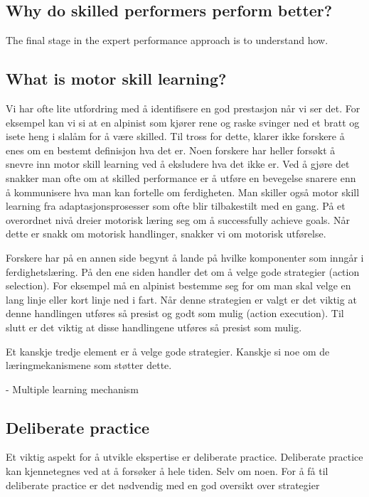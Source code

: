 \documentclass[letterpaper,10pt]{article}
\begin{document}
\subsection{Why do skilled performers perform better?}
The final stage in the expert performance approach is to understand how.

\subsection{What is motor skill learning?}
Vi har ofte lite utfordring med å identifisere en god prestasjon når vi ser det. For eksempel kan vi si at en alpinist som kjører rene og raske svinger ned et bratt og isete heng i slalåm for å være skilled. Til tross for dette, klarer ikke forskere å enes om en bestemt definisjon hva det er. Noen forskere har heller forsøkt å snevre inn motor skill learning ved å eksludere hva det ikke er. Ved å gjøre det snakker man ofte om at skilled performance er å utføre en bevegelse snarere enn å kommunisere hva man kan fortelle om ferdigheten. Man skiller også motor skill learning fra adaptasjonsprosesser som ofte blir tilbakestilt med en gang. På et overordnet nivå dreier motorisk læring seg om å successfully achieve goals. Når dette er snakk om motorisk handlinger, snakker vi om motorisk utførelse.

Forskere har på en annen side begynt å lande på hvilke komponenter som inngår i ferdighetslæring. På den ene siden handler det om å velge gode strategier (action selection). For eksempel må en alpinist bestemme seg for om man skal velge en lang linje eller kort linje ned i fart. Når denne strategien er valgt er det viktig at denne handlingen utføres så presist og godt som mulig (action execution). Til slutt er det viktig at disse handlingene utføres så presist som mulig. 

Et kanskje tredje element er å velge gode strategier. Kanskje si noe om de læringmekanismene som støtter dette. 


- Multiple learning mechanism

\subsection{Deliberate practice}
Et viktig aspekt for å utvikle ekspertise er deliberate practice. Deliberate practice kan kjennetegnes ved at å forsøker å hele tiden. Selv om noen. For å få til deliberate practice er det nødvendig med en god oversikt over strategier 
\end{document}
